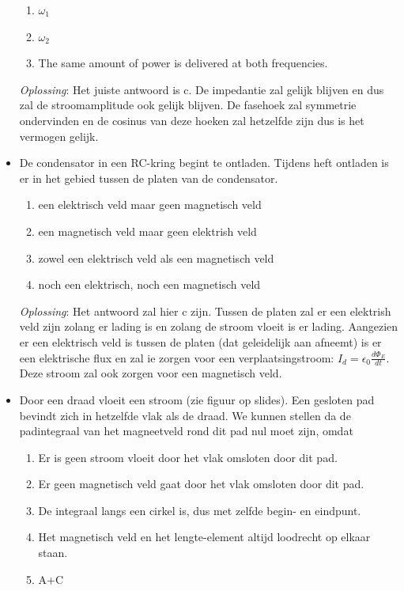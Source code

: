 \documentclass[12pt,a4paper]{article}
\begin{document}
\begin{itemize}
    	\begin{enumerate}[label=\alph*]
    		\item $\omega_1$
    		\item $\omega_2$
    		\item The same amount of power is delivered at both frequencies.
    	\end{enumerate}
    	\textit{Oplossing}: Het juiste antwoord is c. De impedantie zal gelijk blijven en dus zal de stroomamplitude ook gelijk blijven. De fasehoek zal symmetrie ondervinden en de cosinus van deze hoeken zal hetzelfde zijn dus is het vermogen gelijk. 
    	\item De condensator in een RC-kring begint te ontladen. Tijdens heft ontladen is er in het gebied tussen de platen van de condensator. 
    	\begin{enumerate}[label=\alph*]
    		\item een elektrisch veld maar geen magnetisch veld
    		\item een magnetisch veld maar geen elektrish veld
    		\item zowel een elektrisch veld als een magnetisch veld
    		\item noch een elektrisch, noch een magnetisch veld
    	\end{enumerate}
    	\textit{Oplossing}: Het antwoord zal hier c zijn. Tussen de platen zal er een elektrish veld zijn zolang er lading is en zolang de stroom vloeit is er lading. Aangezien er een elektrisch veld is tussen de platen (dat geleidelijk aan afneemt) is er een elektrische flux en zal ie zorgen voor een verplaatsingstroom:  \(I_d = \epsilon_0\frac{d\Phi_E}{dt}\). Deze stroom zal ook zorgen voor een magnetisch veld. 
    	\item Door een draad vloeit een stroom (zie figuur op slides). Een gesloten pad bevindt zich in hetzelfde vlak als de draad. We kunnen stellen da de padintegraal van het magneetveld rond dit pad nul moet zijn, omdat
    	\begin{enumerate}[label=\alph*]
    		\item Er is geen stroom vloeit door het vlak omsloten door dit pad. 
    		\item Er geen magnetisch veld gaat door het vlak omsloten door dit pad.
    		\item De integraal langs een cirkel is, dus met zelfde begin- en eindpunt.
    		\item Het magnetisch veld en het lengte-element altijd loodrecht op elkaar staan. 
    		\item A+C

\end{enumerate}
\end{itemize}
\end{document}
